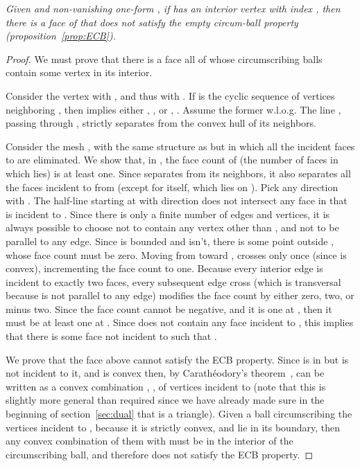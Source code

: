 \documentclass[11pt]{article}
\begin{document}
\emph{
Given  and non-vanishing one-form , if 
has an interior vertex  with index
, then there is a face  of
 that does not satisfy the empty circum-ball
property (proposition~\ref{prop:ECB}). 
}
\begin{proof}
We must prove that there is a face  all of whose circumscribing balls
contain some vertex in its interior. 

Consider the vertex  with
, and thus
with . If  is the cyclic sequence of vertices neighboring
, then 
 implies either , , or , . 
Assume the former w.l.o.g. The line , passing through
, strictly separates  from the convex hull of its neighbors. 

Consider the mesh , with the same structure as  but in which all the incident faces to 
are eliminated. 
We show that, in , the face count of  (the number of faces in which  lies) is at
least one. 
Since  separates  from its neighbors, it also separates all the faces
incident to  from  (except for  itself, which lies on ). 
Pick any direction  with . 
The half-line  starting at  with direction  does not intersect any face in  that is incident to . 
Since there is only a finite number of edges and vertices, it is always
possible to choose  not to contain any vertex other than , and not to be parallel to any edge. 
Since  is bounded and  isn't, there is
some point  outside , whose face count must be zero. 
Moving from  toward ,  crosses  only once 
(since  is convex), incrementing the face count to one. 
Because every interior edge is incident to exactly two faces, 
every subsequent edge cross (which is transversal because  is not
parallel to any edge) modifies the face count by either zero, two, or
minus two. Since the face count cannot be negative, and it is one at 
, then it must be at least one at . 
Since  does not contain any face incident to , 
this implies that there is
some face  not incident to  such that . 

We prove that the face  above cannot satisfy the ECB property. 
Since  is in  but is not incident to it, and  is convex
then, by Carath\'eodory's theorem~\cite{matousek2002lectures},  can be written as a 
convex combination ,
,  of vertices 
incident to  
(note that this is slightly more general than required since we have 
already made sure in the beginning of section~\ref{sec:dual} that  is a triangle). 
Given a ball circumscribing the vertices incident to , 
because it is strictly convex, and  lie in its boundary, 
then any convex combination of them with  must be in the
interior of the circumscribing ball, and therefore  does not satisfy the ECB property. 
\end{proof}
\end{document}
